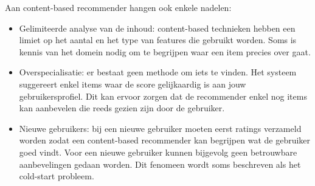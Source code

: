 Aan content-based recommender hangen ook enkele nadelen:
\begin{itemize}
\item Gelimiteerde analyse van de inhoud: content-based technieken hebben een limiet op het aantal en het type van features die gebruikt worden. Soms is kennis van het domein nodig om te begrijpen waar een item precies over gaat. 
\item Overspecialisatie: er bestaat geen methode om iets  te vinden. Het systeem suggereert enkel items waar de score gelijkaardig is aan jouw gebruikersprofiel. Dit kan ervoor zorgen dat de recommender enkel nog items kan aanbevelen die reeds gezien zijn door de gebruiker. 
\item Nieuwe gebruikers: bij een nieuwe gebruiker moeten eerst ratings verzameld worden zodat een content-based recommender kan begrijpen wat de gebruiker goed vindt. Voor een nieuwe gebruiker kunnen bijgevolg geen betrouwbare aanbevelingen gedaan worden. Dit fenomeen wordt soms beschreven als het cold-start probleem.
\end{itemize}



